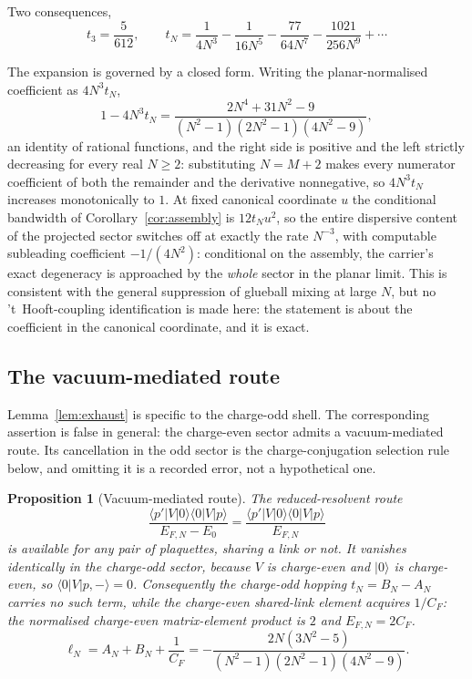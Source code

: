 \documentclass[11pt]{article}
\theoremstyle{plain}
\newtheorem{proposition}[theorem]{Proposition}
\theoremstyle{definition}
\theoremstyle{remark}
\newcommand{\chk}[1]{}
\newcommand{\CF}{C_F}
\begin{document}
Two consequences,
\begin{equation}\label{eq:tsmall}
  t_3=\frac{5}{612},\qquad
  t_N=\frac1{4N^3}-\frac1{16N^5}-\frac{77}{64N^7}-\frac{1021}{256N^9}+\cdots
\end{equation}
\chk{t\_2 = 0 and t\_3 = 5/612}\chk{large-N expansion of t\_N through 1/N\^{}9}

The expansion is governed by a closed form. Writing the planar-normalised
coefficient as $4N^3t_N$,
\begin{equation}\label{eq:planar}
  1-4N^3t_N=\frac{2N^4+31N^2-9}{(N^2-1)(2N^2-1)(4N^2-9)},
\end{equation}
an identity of rational functions, and the right side is positive and the
left strictly decreasing for every real $N\ge2$: substituting $N=M+2$ makes
every numerator coefficient of both the remainder and the derivative
nonnegative, so $4N^3t_N$ increases monotonically to $1$. At fixed canonical
coordinate $u$ the conditional bandwidth of Corollary~\ref{cor:assembly} is
$12t_Nu^2$, so the entire dispersive content of the projected sector
switches off at exactly the rate $N^{-3}$, with computable subleading
coefficient $-1/(4N^2)$: conditional on the assembly, the carrier's exact
degeneracy is approached by the \emph{whole} sector in the planar limit.
This is consistent with the general suppression of glueball mixing at large
$N$, but no 't~Hooft-coupling identification is made here: the statement is
about the coefficient in the canonical coordinate, and it is exact.
\chk{deficit identity 1/4 - N\^{}3 t\_N}
\chk{N\^{}3 t\_N increases monotonically to 1/4}

\subsection{The vacuum-mediated route}

Lemma~\ref{lem:exhaust} is specific to the charge-odd shell. The
corresponding assertion is false in general: the charge-even sector admits a
vacuum-mediated route. Its cancellation in the odd sector is the
charge-conjugation selection rule below, and omitting it is a recorded error,
not a hypothetical one.

\begin{proposition}[Vacuum-mediated route]\label{prop:vacuum}
The reduced-resolvent route
\[
 \frac{\langle p'|V|0\rangle\langle 0|V|p\rangle}{E_{F,N}-E_0}
 =\frac{\langle p'|V|0\rangle\langle 0|V|p\rangle}{E_{F,N}}
\]
is available for any
pair of plaquettes, sharing a link or not. It vanishes identically in the
charge-odd sector, because $V$ is charge-even and $|0\rangle$ is charge-even,
so $\langle0|V|p,-\rangle=0$. Consequently the charge-odd hopping
$t_N=B_N-A_N$ carries no such term, while the charge-even shared-link element
acquires $1/\CF$: the normalised charge-even matrix-element product is $2$
and $E_{F,N}=2\CF$.
\[
  \ell_N=A_N+B_N+\frac1{\CF}
  =-\frac{2N(3N^2-5)}{(N^2-1)(2N^2-1)(4N^2-9)} .
\]
\end{proposition}
\chk{ell\_N = A\_N + B\_N + 1/C\_F, the vacuum-mediated route at every rank}
\end{document}
